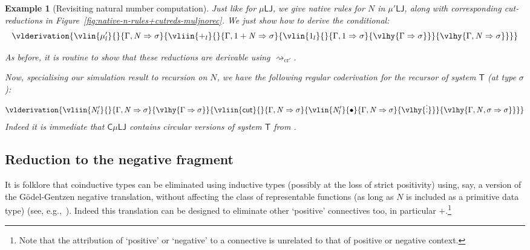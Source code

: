 \documentclass[10pt,a4paper]{amsart}
\theoremstyle{plain}
\newtheorem{example}[example]{Example}
\theoremstyle{definition}
\newcommand{\dfn}{:=}
\renewcommand{\todo}[1]{}
\theoremstyle{plain}
\theoremstyle{definition} %
\renewcommand{\succ}{\mathsf s}
\newcommand{\nat}{\mathit{N}}
\newcommand{\N}{\nat} %
\newcommand{\unit}{1}
\newcommand{\seqar}{\Rightarrow}
\newcommand{\cnd}{\mathsf{cond}}
\newcommand{\rec}[1]{\mathsf{rec}_{#1}}
\newcommand{\Nzero}{\rr\N^0}
\newcommand{\Nsucc}{\rr\N^1}
\newcommand{\Ncnd}{\lr \N'}
\newcommand{\cut}{\mathsf{cut}}
\newcommand{\lr}[1]{#1_l}
\newcommand{\rr}[1]{#1_r}
\newcommand{\LJ}{\mathsf{LJ}}
\newcommand{\T}{\mathsf{T}}
\newcommand{\muLJ}{\mu\LJ}
\newcommand{\muLJnorec}{\mu'\LJ}
\newcommand{\circular}{\mathsf C}
\newcommand{\cmuLJ}{\circular\muLJ}
\newcommand{\rewrite}{\rightsquigarrow}
\newcommand{\cutreductionnorec}{\mathrm{cr}'}
\newcommand{\cutrednorec}{\rewrite_{\cutreductionnorec}}
\begin{document}
\begin{example}
    [Revisiting natural number computation]
    Just like for $\muLJ$, we give native rules for $\N$ in $\muLJnorec$, along with corresponding cut-reductions in Figure~\ref{fig:native-n-rules+cutreds-muljnorec}. We just show how to derive the conditional:
 \[
\vlderivation
{
\vlin{\lr {\mu'}}{}{\Gamma, \N \seqar \sigma}
{
\vliin{\lr{+}}{}{\Gamma, \unit + \N \seqar \sigma}
{
\vlin{\lr \unit}{}{\Gamma, \unit \seqar \sigma}{\vlhy{\Gamma \seqar \sigma}}
}
{
\vlhy{\Gamma , \N \seqar \sigma }
}
}
}
\]
    
    As before, it is routine to show that these reductions are derivable using $\cutrednorec$.
    
Now, specialising our simulation result to recursion on $\N$, we have  the  following regular coderivation for the recursor of system $\T$ (at type $\sigma$):
    \[
           \vlderivation{
            \vliin{\Ncnd }{}{\Gamma, \N \seqar \sigma}
            {
            \vlhy{\Gamma \seqar \sigma}
            }{
            \vliin{\cut}{}{\Gamma, \N \seqar \sigma}
              {
              \vlin{\Ncnd}{\bullet}{\Gamma, \N \seqar \sigma}{\vlhy{\vdots}}
              }{
              \vlhy{\Gamma, \N,\sigma  \seqar \sigma}
              }
            } 
           }
    \]
Indeed it is immediate that $\cmuLJ$ contains circular versions of system $\T$ from \cite{Das21:CT-preprint,Das21:CT-fscd,KuperbergPP21systemT}.
\end{example}

\subsection{Reduction to the negative fragment}
\label{subsec:reduction-to-neg-frag}
It is folklore that coinductive types can be eliminated using inductive types (possibly at the loss of strict positivity) using, say, a version of the G\"odel-Gentzen negative translation, without affecting the class of representable functions (as long as $\N$ is included as a primitive data type) (see, e.g.,~\cite{avigad1998godel}).
Indeed this translation can be designed to eliminate other `positive' connectives too, in particular $+$.\footnote{Note that the attribution of `positive' or `negative' to a connective is unrelated to that of positive or negative context.}
\end{document}

